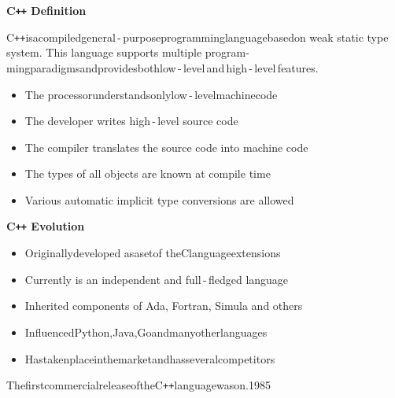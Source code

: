 \documentclass{beamer}
\begin{document}
\begin{frame}{\bf C\texttt{++} Definition}

    \begin{block}
    \justifying C\texttt{++}\;is\;a\;compiled\:general\,-\,purpose\:programming\:language\;based\:on weak static type system. This language supports multiple program- ming\:paradigms\:and\:provides\:both\:low\,-\,level\,and\,high\,-\,level\,features.
    \end{block}

    \begin{itemize}

        \item The processor\;understands\;only\;low\,-\,level\;machine\;code

        \item The developer writes high\,-\,level source code

        \item The compiler translates the source code into machine code

        \item The types of all objects are known at compile time

        \item Various automatic implicit type conversions are allowed
        
    \end{itemize}
    
\end{frame}

\begin{frame}{\bf C\texttt{++} Evolution}
    
    \begin{itemize}

        \item Originally\;developed as\;a\;set\;of the\;C\;language\;extensions

        \item Currently is an independent and full\,-\,fledged language

        \item Inherited components of Ada, Fortran, Simula and others

        \item Influenced\;Python,\:Java,\:Go\;and\;many\;other\;languages

        \item Has\;taken\;place\;in\;the\;market\;and\;has\;several\;competitors
         
    \end{itemize}

    \begin{block}
    \justifying The\:first\:commercial\:release\:of\:the\:C\texttt{++}\:language\:was\:on.1985
    \end{block}
    
\end{frame}
\end{document}
